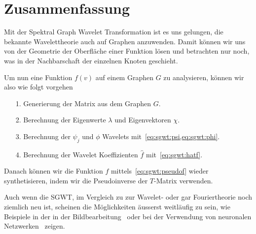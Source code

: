 
\section{Zusammenfassung\label{sec:sgwt:summary}}

Mit der Spektral Graph Wavelet Transformation ist es uns gelungen, die bekannte 
Wavelettheorie auch auf Graphen anzuwenden. Damit k\"onnen wir uns von der 
Geometrie der Oberfl\"ache einer Funktion l\"osen und betrachten nur noch, was 
in der Nachbarschaft der einzelnen Knoten geschieht.

Um nun eine Funktion $f(v)$ auf einem Graphen $G$ zu analysieren, k\"onnen wir 
also wie folgt vorgehen
\begin{itemize}
    \item[1.] Generierung der \laplaceL{} Matrix aus dem Graphen $G$.
    \item[2.] Berechnung der Eigenwerte $\lambda$ und Eigenvektoren $\chi$.
    \item[3.] Berechnung der $\psi_j$ und $\phi$ Wavelets 
    mit~\cref{eq:sgwt:psi,eq:sgwt:phi}.
    \item[4.] Berechnung der Wavelet Koeffizienten $\hat{f}$ 
    mit~\cref{eq:sgwt:hatf}.
\end{itemize}
Danach k\"onnen wir die Funktion $f$ mittels~\cref{eq:sgwt:pseudof} wieder 
synthetisieren, indem wir die Pseudoinverse der $T$-Matrix verwenden.

Auch wenn die SGWT, im Vergleich zu zur Wavelet- oder gar Fouriertheorie noch 
ziemlich neu ist, scheinen die M\"oglichkeiten \"ausserst weitl\"aufig zu sein, 
wie Beispiele in der in der Bildbearbeitung~\cite{shuman_emerging_2013} oder 
bei der Verwendung von neuronalen Netzwerken~\cite{xu_graph_2019} zeigen.

